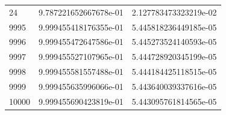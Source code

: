 \documentclass[pdf,color]{UoBnote}
\begin{document}
\begin{table}[H]
{\begin{tabular}{l|l|l}
    24    & 9.787221652667678e-01 & 2.127783473323219e-02 \\
    9995  & 9.999455418176355e-01 & 5.445818236449185e-05 \\
    9996  & 9.999455472647586e-01 & 5.445273524140593e-05 \\
    9997  & 9.999455527107965e-01 & 5.444728920345199e-05 \\
    9998  & 9.999455581557488e-01 & 5.444184425118515e-05 \\
    9999  & 9.999455635996066e-01 & 5.443640039337616e-05 \\
    10000 & 9.999455690423819e-01 & 5.443095761814565e-05 \\
    \end{tabular}}
\end{table}
\end{document}
